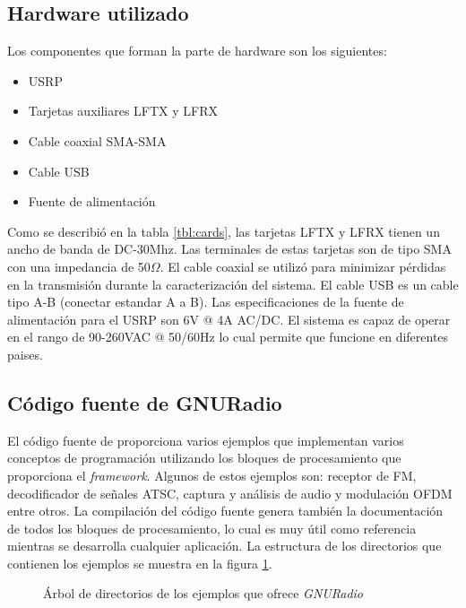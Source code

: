 \subsection{Hardware utilizado}
Los componentes que forman la parte de hardware son los siguientes:

\begin{itemize}
  \item USRP
  \item Tarjetas auxiliares LFTX y LFRX
  \item Cable coaxial SMA-SMA
  \item Cable USB
  \item Fuente de alimentaci\'on
\end{itemize} 

Como se describi\'o en la tabla \ref{tbl:cards}, las tarjetas LFTX y LFRX tienen un ancho de banda
de DC-30Mhz. Las terminales de estas tarjetas son de tipo SMA con una impedancia de 50$\Omega$. El
cable coaxial se utiliz\'o para minimizar p\'erdidas en la transmisi\'on durante la caracterizaci\'on
del sistema. El cable USB es un cable tipo A-B (conectar estandar A a B). Las especificaciones de la
fuente de alimentaci\'on para el USRP son 6V @ 4A AC/DC. El sistema es capaz de operar en el rango
de 90-260VAC @ 50/60Hz lo cual permite que funcione en diferentes paises.


\subsection{C\'odigo fuente de GNURadio}
El c\'odigo fuente de \gnuradio proporciona varios ejemplos que implementan varios conceptos de programaci\'on
utilizando los bloques de procesamiento que proporciona el \emph{framework}. Algunos de estos
ejemplos son: receptor de FM, decodificador de se\~nales ATSC, captura y an\'alisis de audio y
modulaci\'on OFDM entre otros. La compilaci\'on del c\'odigo fuente genera tambi\'en la documentaci\'on de todos
los bloques de procesamiento, lo cual es muy \'util como referencia mientras se desarrolla cualquier
aplicaci\'on. La estructura de los directorios que contienen los ejemplos se muestra en la figura
\ref{fig:extree}.

\begin{figure}[ht]
\DTsetlength{1.5em}{1em}{0.2em}{0.4pt}{1.6pt} %
	\vspace{0.5in}
	\caption{\'Arbol de directorios de los ejemplos que ofrece \emph{GNURadio}}
	\label{fig:extree}
\end{figure}

